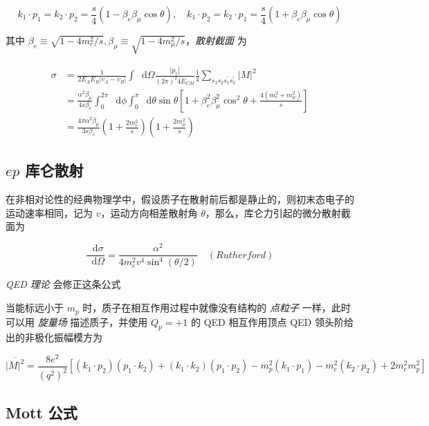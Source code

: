 \documentclass[oneside,a4paper,openany,11pt]{ctexbook}
\newcommand*{\dif}{\mathop{}\!\mathrm{d}} %
\begin{document}
\begin{equation}
    k_1 \cdot p_1 = k_2 \cdot p_2 = \frac{s}{4} (1 - \beta_e \beta_\mu \cos\theta), \quad k_1 \cdot p_2 = k_2 \cdot p_1 = \frac{s}{4} (1 + \beta_e \beta_\mu \cos\theta)
\end{equation}

其中 $\beta_e \equiv \sqrt{1-4 m_e^2/s}, \beta_\mu \equiv \sqrt{1-4 m_\mu^2/s}$，\emph{散射截面} 为

\begin{align}
    \sigma &= \frac{1}{2 E_A E_B |v_A - v_B|} \int \dif\Omega \frac{|p_1|}{(2\pi)^2 4 E_{CM}} \frac{1}{4} \sum_{s_1 s_2 s_1^\prime s_2^\prime} |M|^2 \\
    &= \frac{\alpha^2 \beta_\mu}{4s\beta_e} \int_0^{2\pi} \dif\phi \int_0^{\pi} \dif\theta \sin\theta \left[1+\beta_e^2 \beta_\mu^2 \cos^2 \theta + \frac{4(m^2_e+m^2_\mu)}{s}\right] \\
    &= \frac{4\pi \alpha^2 \beta_\mu}{3s\beta_e} \left(1+\frac{2 m^2_e}{s}\right) \left(1+\frac{2 m^2_\mu}{s}\right)
\end{align}

\subsection{$ep$ 库仑散射}

在非相对论性的经典物理学中，假设质子在散射前后都是静止的，则初末态电子的运动速率相同，记为 $v$，运动方向相差散射角 $\theta$，那么，库仑力引起的微分散射截面为

\begin{equation}
    \frac{\dif\sigma}{\dif\Omega} = \frac{\alpha^2}{4 m_e^2 v^4 \sin^4(\theta/2)} \quad (Rutherford)
\end{equation}

\emph{QED 理论} 会修正这条公式

当能标远小于 $m_p$ 时，质子在相互作用过程中就像没有结构的 \emph{点粒子} 一样，此时可以用 \emph{旋量场} 描述质子，并使用 $Q_p=+1$ 的 QED 相互作用顶点 QED 领头阶给出的非极化振幅模方为

\begin{equation}
    \overline{|M|^2} = \frac{8 e^2}{(q^2)^2} \left[(k_1 \cdot p_2) (p_1 \cdot k_2) + (k_1 \cdot k_2) (p_1 \cdot p_2) - m_p^2 (k_1 \cdot p_1) - m_e^2 (k_2 \cdot p_2) + 2 m_e^2 m_p^2\right]
\end{equation}

\subsection{Mott 公式}
\end{document}
